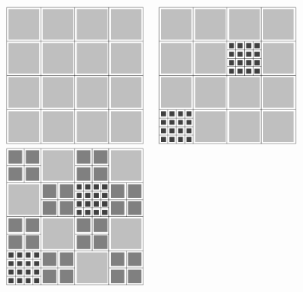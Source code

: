 \centerline{\includegraphics[width=1.8in]{amr4-1.pdf} \ \
            \includegraphics[width=1.8in]{amr4-2.pdf} \ \
            \includegraphics[width=1.8in]{amr4-3.pdf}}


